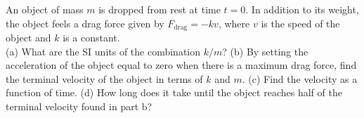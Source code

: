 An object of mass $m$ is dropped from rest at time $t=0$. In addition
to its weight, the object feels a drag force given by $F_\text{drag}
= - k v$, where $v$ is the speed of the object and $k$ is a constant.\\
%
(a) What are the SI units of the combination $k/m$?\hwendpart
%
(b) By setting the acceleration of the object equal to zero when there
is a maximum drag force, find the terminal velocity of the object in
terms of $k$ and $m$.\hwendpart
%
(c) Find the velocity as a function of time.\hwendpart
%
(d) How long does it take until the object reaches half of the
terminal velocity found in part b?
